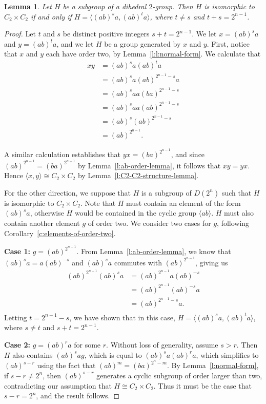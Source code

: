 \documentclass{amsart}
\numberwithin{equation} {section}
\newtheorem{lemma}[equation]{Lemma}
\theoremstyle{definition}
\begin{document}
\begin{lemma}\label{l:copies-of-C2-times-C2}
Let $H$ be a subgroup of a dihedral $2$-group. Then $H$ is isomorphic to $C_2 \times C_2$ if and only if $H = \langle (ab)^sa, (ab)^ta \rangle$, where $t \neq s$ and $t + s = 2^{n-1}$.
\end{lemma}

\begin{proof}
Let $t$ and $s$ be distinct positive integers $s + t = 2^{n-1}$. We let $x = (ab)^sa$ and $y = (ab)^ta$, and we let $H$ be a group generated by $x$ and $y$. First, notice that $x$ and $y$ each have order two, by Lemma~\ref{l:l:normal-form}. We calculate that
\begin{align*}
xy &= (ab)^sa(ab)^ta \\
&= (ab)^s a (ab)^{2^{n-1} - s} a \\
&= (ab)^s a a (ba)^{2^{n-1} - s} \\
&= (ab)^s a a (ab)^{2^{n-1} - s} \\
&= (ab)^s (ab)^{2^{n-1} - s} \\
&= (ab)^{2^{n-1}}.
\end{align*}

A similar calculation establishes that $yx = (ba)^{2^{n-1}}$, and since $(ab)^{2^{n-1}} = (ba)^{2^{n-1}}$ by Lemma~\ref{l:ab-order-lemma}, it follows that $xy = yx$. Hence $\langle x, y \rangle \cong C_2 \times C_2$ by Lemma~\ref{l:C2-C2-structure-lemma}. 

For the other direction, we suppose that $H$ is a subgroup of $D(2^n)$ such that $H$ is isomorphic to $C_2 \times C_2$. Note that $H$ must contain an element of the form $(ab)^sa$, otherwise $H$ would be contained in the cyclic group $\langle ab \rangle$. $H$ must also contain another element $g$ of order two. We consider two cases for $g$, following Corollary~\ref{c:elements-of-order-two}. 

\textbf{Case 1:} $g = (ab)^{2^{n-1}}$. From Lemma~\ref{l:ab-order-lemma}, we know that $(ab)^s a = a (ab)^{-s}$ and $(ab)^s a$ commutes with $(ab)^{2^{n-1}}$, giving us \begin{align*}
(ab)^{2^{n-1}}(ab)^s a &= (ab)^{2^{n-1}} a (ab)^{-s} \\
&= (ab)^{2^{n-1}} (ab)^{-s} a \\
&= (ab)^{2^{n-1} - s} a. \\
\end{align*}
Letting $t = 2^{n-1} - s$, we have shown that in this case, $H = \langle (ab)^s a, (ab)^t a \rangle$, where $s \neq t$ and $s + t = 2^{n-1}$.

\textbf{Case 2:} $g = (ab)^r a $ for some $r$. Without loss of generality, assume $s > r$. Then $H$ also contains $(ab)^s a g$, which is equal to $(ab)^s a (ab)^r a$, which simplifies to $(ab)^{s-r}$ using the fact that $(ab)^m = (ba)^{2^n - m}$. By Lemma~\ref{l:normal-form}, if $s-r \neq 2^n$, then $(ab)^{s-r}$ generates a cyclic subgroup of order larger than two, contradicting our assumption that $H \cong C_2 \times C_2$. Thus it must be the case that $s-r = 2^n$, and the result follows. 
\end{proof}
\end{document}
